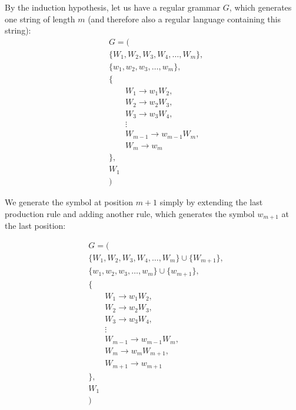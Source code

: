 \documentclass[10pt]{article}
\begin{document}
\begin{description}
        By the induction hypothesis, let us have a regular grammar $G$, which generates one string of length $m$ (and therefore also a regular language containing this string):
        \begin{align*}
            & G = ( \\
            &\{W_1, W_2, W_3, W_4, \dots, W_m\}, \\
            &\{w_1, w_2, w_3, \dots, w_m\}, \\
            &\{\\
            &\qquad W_1 \rightarrow w_{1}W_2, \\
            &\qquad W_2 \rightarrow w_{2}W_3, \\
            &\qquad W_3 \rightarrow w_{3}W_4, \\
            &\qquad \vdots \\
            &\qquad W_{m-1} \rightarrow w_{m-1}W_m, \\
            &\qquad W_{m} \rightarrow w_{m} \\
            &\},\\
            &W_1\\
            &)
        \end{align*}

        We generate the symbol at position $m + 1$ simply by extending the last production rule and adding another rule, which generates the symbol $w_{m + 1}$ at the last position:

        \begin{align*}
            & G = ( \\
            &\{W_1, W_2, W_3, W_4, \dots, W_m\} \cup \{W_{m+1}\}, \\
            &\{w_1, w_2, w_3, \dots, w_m\} \cup \{w_{m+1}\}, \\
            &\{\\
            &\qquad W_1 \rightarrow w_{1}W_2, \\
            &\qquad W_2 \rightarrow w_{2}W_3, \\
            &\qquad W_3 \rightarrow w_{3}W_4, \\
            &\qquad \vdots \\
            &\qquad W_{m-1} \rightarrow w_{m-1}W_m, \\
            &\qquad W_{m} \rightarrow w_{m}W_{m+1}, \\
            &\qquad W_{m+1} \rightarrow w_{m+1} \\
            &\},\\
            &W_1\\
            &)
        \end{align*}


\end{description}
\end{document}
